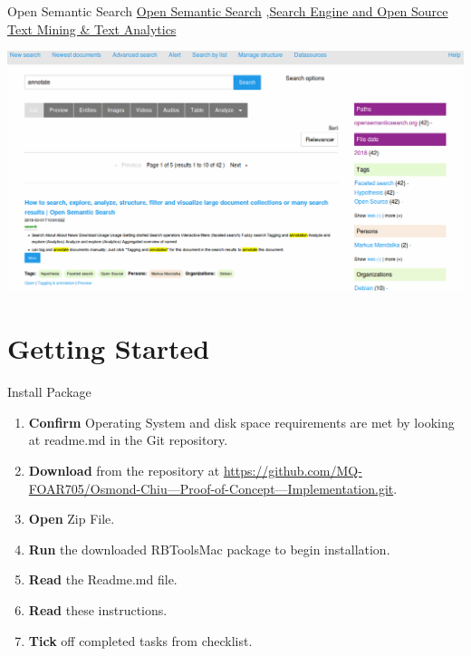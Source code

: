 \documentclass[10pt,a4paper]{article}
\begin{document}
\begin{textbox}{Open Semantic Search}
\href{https://www.opensemanticsearch.org}{Open Semantic Search} \sep \href{https://www.opensemanticsearch.org}{Search Engine and Open Source Text Mining & Text Analytics}

\includegraphics[width=\textwidth]{search.png}

\end{textbox}



\section{Getting Started}



\begin{textbox}{Install Package}
 

  

\begin{enumerate}
\item \textbf{Confirm} Operating System and disk space requirements are met by looking at readme.md in the Git repository.
\item \textbf{Download} from the repository at \href{https://github.com/MQ-FOAR705/Osmond-Chiu---Proof-of-Concept---Implementation.git}{https://github.com/MQ-FOAR705/Osmond-Chiu---Proof-of-Concept---Implementation.git}.
\item \textbf{Open} Zip File.
\item \textbf{Run} the downloaded RBToolsMac package to begin installation.
\item \textbf{Read} the Readme.md file.
\item \textbf{Read} these instructions.
\item \textbf{Tick} off completed tasks from checklist.
\end{enumerate}

\end{textbox}
\end{document}
